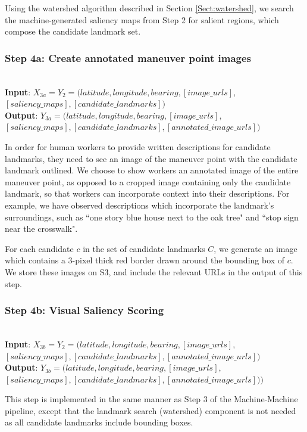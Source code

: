 Using the watershed algorithm described in Section \ref{Sect:watershed}, we search the machine-generated saliency maps from Step 2 for salient regions, which compose the candidate landmark set.

\subsubsection*{Step 4a: Create annotated maneuver point images}~\\
\noindent\textbf{Input}: $X_{3a} = Y_2 = (latitude, longitude, bearing, [image\_urls], $\\$[saliency\_maps], [candidate\_landmarks] )$ \\
\textbf{Output}: $Y_{3a} = (latitude, longitude, bearing, [image\_urls],$\\$ [saliency\_maps], [candidate\_landmarks], [annotated\_image\_urls])$ 

In order for human workers to provide written descriptions for candidate landmarks, they need to see an image of the maneuver point with the candidate landmark outlined. We choose to show workers an annotated image of the entire maneuver point, as opposed to a cropped image containing only the candidate landmark, so that workers can incorporate context into their descriptions. For example, we have observed descriptions which incorporate the landmark's surroundings, such as ``one story blue house next to the oak tree" and ``stop sign near the crosswalk".

For each candidate $c$ in the set of candidate landmarks $C$, we generate an image which contains a 3-pixel thick red border drawn around the bounding box of $c$. We store these images on S3, and include the relevant URLs in the output of this step.

\subsubsection*{Step 4b: Visual Saliency Scoring}~\\
\noindent\textbf{Input}: $X_{3b} = Y_2 = (latitude, longitude, bearing,  [image\_urls], $\\$[saliency\_maps], [candidate\_landmarks], [annotated\_image\_urls] )$\\
\textbf{Output}: $Y_{3b} = (latitude, longitude, bearing,  [image\_urls], $\\$[saliency\_maps], [candidate\_landmarks], [annotated\_image\_urls] ) )$ 

This step is implemented in the same manner as Step 3 of the Machine-Machine pipeline, except that the landmark search (watershed) component is not needed as all candidate landmarks include bounding boxes.

